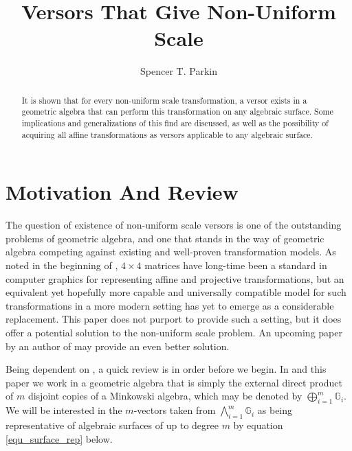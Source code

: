 \documentclass{birkjour}
\theoremstyle{definition}
\theoremstyle{remark}
\numberwithin{equation}{section}
\newcommand{\G}{\mathbb{G}}
\begin{document}
\title{Versors That Give Non-Uniform Scale}

\author{Spencer T. Parkin}
\address{102 W. 500 S., \\
Salt Lake City, UT  84101} 



\begin{abstract}
It is shown that for every non-uniform scale transformation, a versor
exists in a geometric algebra that can perform this transformation
on any algebraic surface.  Some implications and generalizations of this find are discussed,
as well as the possibility of acquiring all affine transformations as versors applicable
to any algebraic surface.
\end{abstract}


\maketitle

\section{Motivation And Review}

The question of existence of non-uniform scale versors is one of the outstanding problems of geometric algebra,
and one that stands in the way of geometric algebra competing against existing and well-proven transformation models.
As noted in the beginning of \cite{Goldman12}, $4\times 4$ matrices have long-time been a standard
in computer graphics for representing affine and projective transformations, but an
equivalent yet hopefully more capable and universally compatible model for such transformations in a more modern setting has yet to emerge
as a considerable replacement.  This paper does not purport to provide such a setting,
but it does offer a potential solution to the non-uniform scale problem.
An upcoming paper by an author of \cite{Dorst07} may provide an even better solution.

Being dependent on \cite{Parkin13}, a quick review is in order before we begin.
In \cite{Parkin13} and this paper we work in a geometric algebra that is simply
the external direct product of $m$ disjoint copies of a Minkowski algebra, which
may be denoted by $\bigoplus_{i=1}^m \G_i$.  We will be interested in the $m$-vectors
taken from $\bigwedge_{i=1}^m \G_i$ as being representative of algebraic surfaces
of up to degree $m$ by equation \eqref{equ_surface_rep} below.
\end{document}
